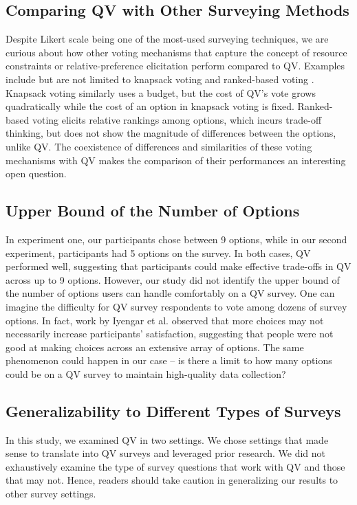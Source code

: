 \subsection{Comparing QV with Other Surveying Methods}

Despite Likert scale being one of the most-used surveying techniques, we are curious about how other voting mechanisms that capture the concept of resource constraints or relative-preference elicitation perform compared to QV. Examples include but are not limited to knapsack voting \cite{goel2015knapsack} and ranked-based voting \cite{ledo2018evaluation}. Knapsack voting similarly uses a budget, but the cost of QV's vote grows quadratically while the cost of an option in knapsack voting is fixed. Ranked-based voting elicits relative rankings among options, which incurs trade-off thinking, but does not show the magnitude of differences between the options, unlike QV. The coexistence of differences and similarities of these voting mechanisms with QV makes the comparison of their performances an interesting open question.

\subsection{Upper Bound of the Number of Options}

In experiment one, our participants chose between 9 options, while in our second experiment, participants had 5 options on the survey. In both cases, QV performed well, suggesting that participants could make effective trade-offs in QV across up to 9 options. However, our study did not identify the upper bound of the number of options users can handle comfortably on a QV survey. One can imagine the difficulty for QV survey respondents to vote among dozens of survey options. In fact, work by Iyengar et al. \cite{iyengar2000choice} observed that more choices may not necessarily increase participants' satisfaction, suggesting that people were not good at making choices across an extensive array of options. The same phenomenon could happen in our case -- is there a limit to how many options could be on a QV survey to maintain high-quality data collection?

\subsection{Generalizability to Different Types of Surveys}
In this study, we examined QV in two settings. We chose settings that made sense to translate into QV surveys and leveraged prior research. We did not exhaustively examine the type of survey questions that work with QV and those that may not. Hence, readers should take caution in generalizing our results to other survey settings.

